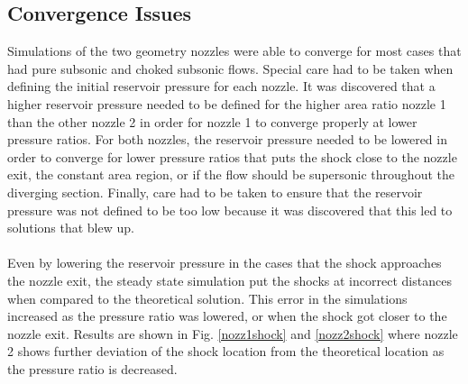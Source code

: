 \documentclass{article}%
\numberwithin{equation}{section}
\begin{document}
\subsection{Convergence Issues}
Simulations of the two geometry nozzles were able to converge for most cases that had pure subsonic and choked subsonic flows. Special care had to be taken when defining the initial reservoir pressure for each nozzle. It was discovered that a higher reservoir pressure needed to be defined for the higher area ratio nozzle 1 than the other nozzle 2 in order for nozzle 1 to converge properly at lower pressure ratios. For both nozzles, the reservoir pressure needed to be lowered in order to converge for lower pressure ratios that puts the shock close to the nozzle exit, the constant area region, or if the flow should be supersonic throughout the diverging section. Finally, care had to be taken to ensure that the reservoir pressure was not defined to be too low because it was discovered that this led to solutions that blew up.
\\
\\
Even by lowering the reservoir pressure in the cases that the shock approaches the nozzle exit, the steady state simulation put the shocks at incorrect distances when compared to the theoretical solution. This error in the simulations increased as the pressure ratio was lowered, or when the shock got closer to the nozzle exit. Results are shown in Fig. \ref{nozz1shock} and \ref{nozz2shock} where nozzle 2 shows further deviation of the shock location from the theoretical location as the pressure ratio is decreased.
\end{document}
